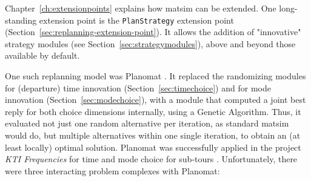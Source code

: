 Chapter~\ref{ch:extensionpoints} explains how \gls{matsim} can be extended. One long-standing extension point is the \lstinline{PlanStrategy} extension point (Section~\ref{sec:replanning-extension-point}). It allows the addition of "innovative" strategy modules (see Section~\ref{sec:strategymodules}), above and beyond those available by default.

One such replanning model was Planomat \citep[][]{MeisterEtAl_IATBR_2006, MeisterEtAl_STRC_2006, Meister_PhDThesis_2011}. It replaced the randomizing modules for (departure) time innovation (Section~\ref{sec:timechoice}) and for mode innovation (Section~\ref{sec:modechoice}), with a module that computed a joint best reply for both choice dimensions internally, using a Genetic Algorithm. Thus, it evaluated not just one random alternative per iteration, as standard \gls{matsim} would do, but multiple alternatives within one single iteration, to obtain an (at least locally) optimal solution. Planomat was successfully applied in the project \emph{KTI Frequencies} for time and mode choice for sub-tours \citep[][p.10]{BalmerEtAl_ResRep_datapuls_2010}.
Unfortunately, there were three interacting problem complexes with Planomat:
